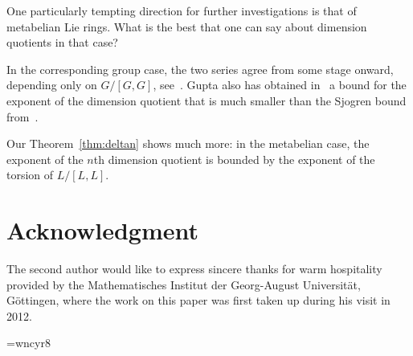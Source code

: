 \documentclass[a4paper,reqno,notitlepage]{amsart}
\theoremstyle{definition}
\begin{document}
One particularly tempting direction for further investigations is that
of metabelian Lie rings. What is the best that one can say about
dimension quotients in that case?

In the corresponding group case, the two series agree from some stage
onward, depending only on $G/[G, G]$, see~\cite{Gupta-Hales-Passi:84}.
Gupta also has obtained in~\cites{Gupta:84,Gupta:91} a bound for the
exponent of the dimension quotient that is much smaller than the
Sjogren bound from~\cite{Sjogren:79}.

Our Theorem~\ref{thm:deltan} shows much more: in the metabelian case,
the exponent of the $n$th dimension quotient is bounded by the
exponent of the torsion of $L/[L,L]$.

\section*{Acknowledgment}
The second author would like to express sincere thanks for warm
hospitality provided by the Mathematisches Institut der Georg-August
Universit\"at, G\"ottingen, where the work on this paper was first
taken up during his visit in 2012.

\begin{bibdiv}
\begin{biblist}
\font\cyreight=wncyr8
\end{biblist}
\end{bibdiv}
\end{document}
